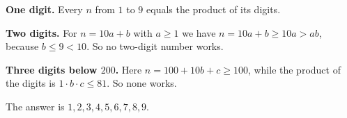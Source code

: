\textbf{One digit.} Every $n$ from $1$ to $9$ equals the product of its digits.

\textbf{Two digits.} For $n=10a+b$ with $a\ge1$ we have $n=10a+b\ge10a>ab$, because $b\le9<10$. So no two-digit number works.

\textbf{Three digits below $200$.} Here $n=100+10b+c\ge100$, while the product of the digits is $1\cdot b\cdot c\le81$. So none works.

The answer is $\boxed{1,2,3,4,5,6,7,8,9}$.
